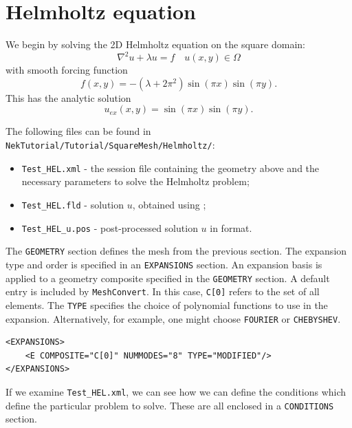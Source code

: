 \documentclass[a4paper,12pt]{article}
\begin{document}
\clearpage
\section{Helmholtz equation}

We begin by solving the 2D Helmholtz equation on the square domain:
\begin{equation}
\nabla^2 u + \lambda u = f \quad u(x,y) \in \Omega
\end{equation}
with smooth forcing function
\begin{equation}
f(x,y)= -(\lambda + 2\pi^2)\sin(\pi x)\sin(\pi y).
\end{equation}
This has the analytic solution
\begin{equation}
u_{ex}(x,y)= \sin(\pi x)\sin(\pi y).
\end{equation}
 
The following files can be found in
\texttt{NekTutorial/Tutorial/SquareMesh/Helmholtz/}:
 \begin{itemize}
 \item \texttt{Test\_HEL.xml} - the \nektar session file containing
 the geometry above and the necessary parameters to solve the Helmholtz problem;
 \item \texttt{Test\_HEL.fld} - solution $u$, obtained using \nektar;
 \item \texttt{Test\_HEL\_u.pos} - post-processed solution $u$ in \gmsh format.
 \end{itemize} 

The \texttt{GEOMETRY} section defines the mesh from the previous section. The
expansion type and order is specified in an \texttt{EXPANSIONS} section. An
expansion basis is applied to a geometry composite specified in the
\texttt{GEOMETRY} section. A default entry is included by \texttt{MeshConvert}.
In this case, \texttt{C[0]} refers to the set of all elements. The \texttt{TYPE}
specifies the choice of polynomial functions to use in the expansion.
Alternatively, for example, one might choose \texttt{FOURIER} or
\texttt{CHEBYSHEV}.

\begin{verbatim}
<EXPANSIONS>
    <E COMPOSITE="C[0]" NUMMODES="8" TYPE="MODIFIED"/>
</EXPANSIONS>
\end{verbatim}

If we examine \texttt{Test\_HEL.xml}, we can see how we can define the
conditions which define the particular problem to solve. These are all enclosed
in a \texttt{CONDITIONS} section.
\end{document}
